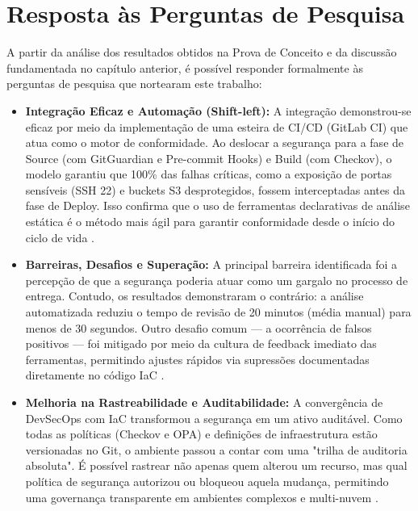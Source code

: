 \section{Resposta às Perguntas de Pesquisa}
A partir da análise dos resultados obtidos na Prova de Conceito e da discussão fundamentada no capítulo anterior, é possível responder formalmente às perguntas de pesquisa que nortearam este trabalho:

\begin{itemize}
    \item\textbf{Integração Eficaz e Automação (Shift-left):} A integração demonstrou-se eficaz por meio da implementação de uma esteira de CI/CD (GitLab CI) que atua como o motor de conformidade. Ao deslocar a segurança para a fase de Source (com GitGuardian e Pre-commit Hooks) e Build (com Checkov), o modelo garantiu que 100\% das falhas críticas, como a exposição de portas sensíveis (SSH 22) e buckets S3 desprotegidos, fossem interceptadas antes da fase de Deploy. Isso confirma que o uso de ferramentas declarativas de análise estática é o método mais ágil para garantir conformidade desde o início do ciclo de vida .
    
    \item\textbf{Barreiras, Desafios e Superação:} A principal barreira identificada foi a percepção de que a segurança poderia atuar como um gargalo no processo de entrega. Contudo, os resultados demonstraram o contrário: a análise automatizada reduziu o tempo de revisão de 20 minutos (média manual) para menos de 30 segundos. Outro desafio comum — a ocorrência de falsos positivos — foi mitigado por meio da cultura de feedback imediato das ferramentas, permitindo ajustes rápidos via supressões documentadas diretamente no código IaC .
    
    \item\textbf{Melhoria na Rastreabilidade e Auditabilidade:} A convergência de DevSecOps com IaC transformou a segurança em um ativo auditável. Como todas as políticas (Checkov e OPA) e definições de infraestrutura estão versionadas no Git, o ambiente passou a contar com uma "trilha de auditoria absoluta". É possível rastrear não apenas quem alterou um recurso, mas qual política de segurança autorizou ou bloqueou aquela mudança, permitindo uma governança transparente em ambientes complexos e multi-nuvem .


\end{itemize}
